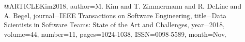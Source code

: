 


@ARTICLE{Kim2018, 
author={M. {Kim} and T. {Zimmermann} and R. {DeLine} and A. {Begel}}, 
journal={IEEE Transactions on Software Engineering}, 
title={Data Scientists in Software Teams: State of the Art and Challenges}, 
year={2018}, 
volume={44}, 
number={11}, 
pages={1024-1038}, 
ISSN={0098-5589}, 
month={Nov},}




